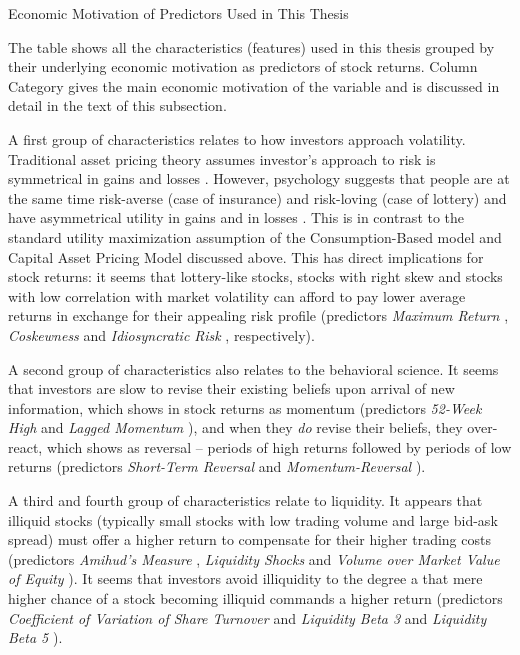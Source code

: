 			\begin{table}
				\resizebox{\textwidth}{!}{}
				\caption{Economic Motivation of Predictors Used in This Thesis}
				\label{tab:characteristics_motivation}
				\medskip
				\small 
				The table shows all the characteristics (features) used in this thesis grouped by their underlying economic motivation as predictors of stock returns. Column Category gives the main economic motivation of the variable and is discussed in detail in the text of this subsection.
			\end{table}
			
			A first group of characteristics relates to how investors approach volatility. Traditional asset pricing theory assumes investor's approach to risk is symmetrical in gains and losses \citep{cochrane2009asset}. However, psychology suggests that people are at the same time risk-averse (case of insurance) and risk-loving (case of lottery) and have asymmetrical utility in gains and in losses \citep{kahneman2013prospect}. This is in contrast to the standard utility maximization assumption of the Consumption-Based model and Capital Asset Pricing Model discussed above. This has direct implications for stock returns: it seems that lottery-like stocks, stocks with right skew and stocks with low correlation with market volatility can afford to pay lower average returns in exchange for their appealing risk profile (predictors \textit{Maximum Return} \citep{bali2011maxing}, \textit{Coskewness} \citep{harvey2000conditional} and \textit{Idiosyncratic Risk} \citep{ang2006cross}, respectively).
			
			A second group of characteristics also relates to the behavioral science. It seems that investors are slow to revise their existing beliefs upon arrival of new information, which shows in stock returns as momentum (predictors \textit{52-Week High} \citep{george200452} and \textit{Lagged Momentum} \citep{novy2012momentum}), and when they \textit{do} revise their beliefs, they over-react, which shows as reversal -- periods of high returns followed by periods of low returns (predictors \textit{Short-Term Reversal} \citep{jegadeesh1990evidence} and \textit{Momentum-Reversal} \citep{jegadeesh1993returns}). 
			
			A third and fourth group of characteristics relate to liquidity. It appears that illiquid stocks (typically small stocks with low trading volume and large bid-ask spread) must offer a higher return to compensate for their higher trading costs (predictors \textit{Amihud's Measure} \citep{amihud2002illiquidity}, \textit{Liquidity Shocks} \citep{bali2013liquidity} and \textit{Volume over Market Value of Equity}  \citep{haugen1996commonality}). It seems that investors avoid illiquidity to the degree a that mere higher chance of a stock becoming illiquid commands a higher return (predictors \textit{Coefficient of Variation of Share Turnover} \citep{chordia2001trading} and \textit{Liquidity Beta 3} and \textit{Liquidity Beta 5}  \citep{acharya2005asset}).  
			
